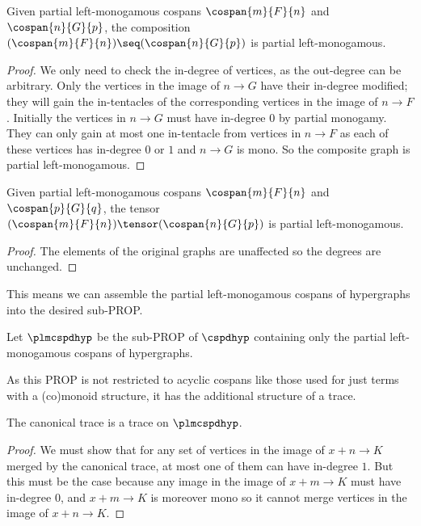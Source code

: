 \begin{lemma}
    Given partial left-monogamous cospans
    \(\cospan{m}{F}{n}\) and
    \(\cospan{n}{G}{p}\), the composition \(
    (\cospan{m}{F}{n})
    \seq
    (\cospan{n}{G}{p})
    \) is partial left-monogamous.
\end{lemma}
\begin{proof}
    We only need to check the in-degree of vertices, as the out-degree can be
    arbitrary.
    Only the vertices in the image of \(n \to G\) have their in-degree modified;
    they will gain the in-tentacles of the corresponding vertices in the image
    of \(n \to F\).
    Initially the vertices in \(n \to G\) must have in-degree \(0\) by partial
    monogamy.
    They can only gain at most one in-tentacle from vertices in \(n \to F\)
    as each of these vertices has in-degree \(0\) or \(1\) and \(n \to G\) is
    mono.
    So the composite graph is partial left-monogamous.
\end{proof}

\begin{lemma}
    Given partial left-monogamous cospans \(\cospan{m}{F}{n}\)
    and \(\cospan{p}{G}{q}\), the tensor \(
    (\cospan{m}{F}{n})
    \tensor
    (\cospan{n}{G}{p})
    \) is partial left-monogamous.
\end{lemma}
\begin{proof}
    The elements of the original graphs are unaffected so
    the degrees are unchanged.
\end{proof}

This means we can assemble the partial left-monogamous cospans of hypergraphs
into the desired sub-PROP.

\begin{definition}
    Let \(\plmcspdhyp\) be the sub-PROP of \(\cspdhyp\) containing only the
    partial left-monogamous cospans of hypergraphs.
\end{definition}

As this PROP is not restricted to acyclic cospans like those used for just
terms with a (co)monoid structure, it has the additional structure of a trace.

\begin{proposition}
    The canonical trace is a trace on \(\plmcspdhyp\).
\end{proposition}
\begin{proof}
    We must show that for any set of vertices in the image
    of \(x + n \to K\) merged by the canonical trace, at most one of them can
    have in-degree \(1\).
    But this must be the case because any image in the image of
    \(x + m \to K\) must have in-degree \(0\), and \(x + m \to K\) is
    moreover mono so it cannot merge vertices in the image of
    \(x + n \to K\).
\end{proof}

